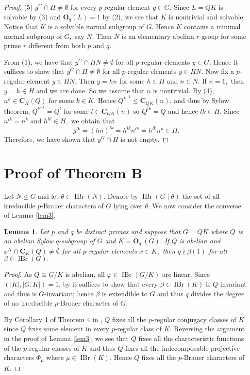 \documentclass[12pt]{amsart}
\newtheorem{lemma}[theorem]{Lemma}
\theoremstyle{remark}
\numberwithin{equation}{section}
\begin{document}
\begin{proof}
\medskip

(5) $y^G\cap H\neq\emptyset$ for every $p$-regular element $y\in G.$ Since $L=QK$ is solvable  by (3) and ${\mathbf{O}}_q(L)=1$ by (2), we see that $K$ is nontrivial and solvable. Notice that $K$ is a solvable normal subgroup of $G.$ Hence $K$ contains a minimal normal subgroup of $G,$ say $N.$ Then $N$ is an elementary abelian $r$-group for some prime $r$ different from both $p$ and $q.$

From (1), we have that $y^G\cap HN\neq\emptyset$ for all $p$-regular elements $y\in G.$ Hence it suffices to show that $y^G\cap H\neq\emptyset$ for all $p$-regular elements $y\in HN.$ Now fix a $p$-regular element $y\in HN.$ Then $y=hn$ for some $h\in H$ and $n\in N.$ If $n=1,$ then $y=h\in H$ and we are done. So we assume that $n$ is nontrivial. By (4), $n^k\in{\mathbf{C}}_K(Q)$ for some $k\in K.$ Hence $Q^{k^{-1}}\le {\mathbf{C}}_{QK}(n)$, and thus by Sylow theorem, $Q^{k^{-1}}=Q^l$ for some $l\in {\mathbf{C}}_{QK}(n)$ so $Q^{lk}=Q$ and hence $lk\in H.$ Since $n^{lk}=n^k$ and $h^{lk}\in H,$ we obtain that  \[y^{lk}=(hn)^{lk}=h^{lk}n^{lk}=h^{lk}n^k\in H.\] Therefore, we have shown that $y^G\cap H$ is not empty.
\end{proof}

\section{Proof of Theorem B}

Let $N\unlhd G$ and let $\theta\in\operatorname{IBr}(N).$ Denote by $\operatorname{IBr}(G \mid \theta)$ the set of all irreducible $p$-Brauer characters of $G$ lying over $\theta.$ We now consider the converse of Lemma \ref{lem3}.

\begin{lemma}\label{lem4} Let $p$ and $q$ be distinct primes and suppose that $G=QK$ where $Q$ is an abelian Sylow $q$-subgroup of $G$ and $K={\mathbf{O}}_{q'}(G).$  If $Q$ is abelian and $x^K\cap{\mathbf{C}}_{K}(Q)\neq\emptyset$ for all $p$-regular elements $x\in K,$ then $q\nmid\beta(1)$ for all $\beta\in\operatorname{IBr}(G).$
\end{lemma}

\begin{proof} As $Q\cong G/K$ is abelian, all $\varphi\in\operatorname{IBr}(G/K)$ are linear. Since $(|K|,|G:K|)=1$, by \cite[Theorem~8.13]{Navarro} it suffices to show that every $\beta\in\operatorname{IBr}(K)$ is $Q$-invariant and thus is $G$-invariant;  hence $\beta$ is extendible to $G$ and thus $q$ divides the degree of no irreducible $p$-Brauer character of $G.$

By Corollary 1 of Theorem 4 in \cite{Glauberman}, $Q$ fixes all the $p$-regular conjugacy classes of $K$ since $Q$ fixes some element in every $p$-regular class of $K.$ Reversing the argument in the proof of Lemma \ref{lem3}, we see that $Q$ fixes all the characteristic functions of the $p$-regular classes of $K$ and thus $Q$ fixes all the indecomposable projective characters $\Phi_\mu$ where $\mu\in\operatorname{IBr}(K).$ Hence $Q$ fixes all the $p$-Brauer characters of $K.$
\end{proof}
\end{document}

